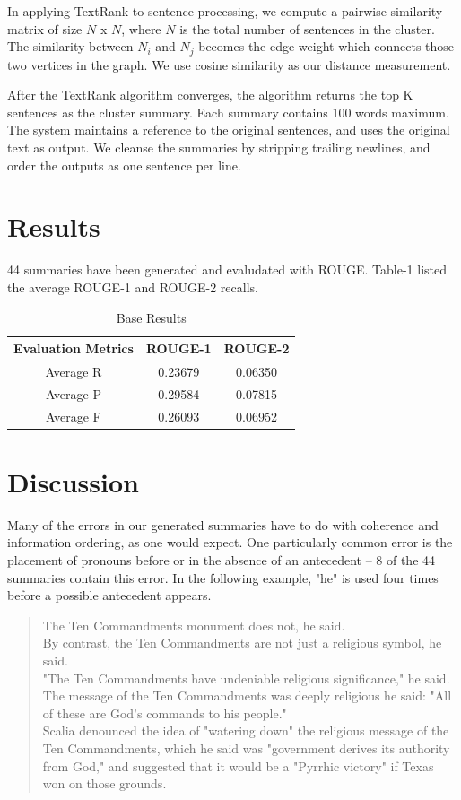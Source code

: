 \documentclass[11pt]{article}
\begin{document}
In applying TextRank to sentence processing, we compute a pairwise similarity matrix of size $N$ x $N$, where $N$ is the total number of sentences in the cluster. The similarity between $N_i$ and $N_j$ becomes the edge weight which connects those two vertices in the graph. We use cosine similarity as our distance measurement.

After the TextRank algorithm converges, the algorithm returns the top K sentences as the cluster summary. Each summary contains 100 words maximum. The system maintains a reference to the original sentences, and uses the original text as output. We cleanse the summaries by stripping trailing newlines, and order the outputs as one sentence per line.
\section{Results}

44 summaries have been generated and evaludated with ROUGE. Table-1 listed the average ROUGE-1 and ROUGE-2 recalls.

\begin{table}[ht]
\caption{Base Results} 
\centering
\begin{tabular}{c c c}
\hline
Evaluation Metrics & ROUGE-1 & ROUGE-2 \\
\hline
Average R          & 0.23679 & 0.06350 \\
\hline
Average P          & 0.29584 & 0.07815 \\
\hline
Average F          & 0.26093 & 0.06952 \\
\hline
\end{tabular}
\end{table}

\section{Discussion}

Many of the errors in our generated summaries have to do with coherence and information ordering, as one would expect. One particularly common error is the placement of pronouns before or in the absence of an antecedent -- 8 of the 44 summaries contain this error. In the following example, "he" is used four times before a possible antecedent appears.\\

\begin{quote}
The Ten Commandments monument does not, he said.\\
By contrast, the Ten Commandments are not just a religious symbol, he said.\\
"The Ten Commandments have undeniable religious significance," he said.\\
The message of the Ten Commandments was deeply religious he said: "All of these are God's commands to his people."\\
Scalia denounced the idea of "watering down" the religious message of the Ten Commandments, which he said was "government derives its authority from God," and suggested that it would be a "Pyrrhic victory" if Texas won on those grounds.
\end{quote}
\end{document}

